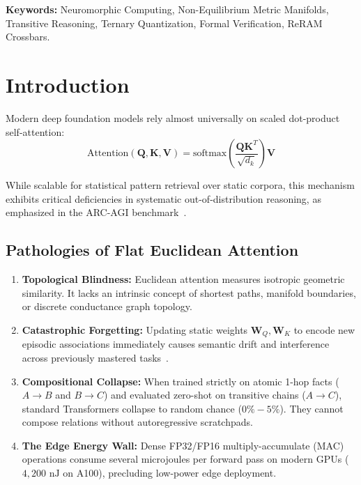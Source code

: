 \documentclass[11pt,a4paper]{article}
\begin{document}
\vspace{0.5em}
\textbf{Keywords:} Neuromorphic Computing, Non-Equilibrium Metric Manifolds, Transitive Reasoning, Ternary Quantization, Formal Verification, ReRAM Crossbars.


\section{Introduction}

Modern deep foundation models rely almost universally on scaled dot-product self-attention:
\begin{equation}
\text{Attention}(\mathbf{Q}, \mathbf{K}, \mathbf{V}) = \text{softmax}\left(\frac{\mathbf{Q}\mathbf{K}^T}{\sqrt{d_k}}\right)\mathbf{V}
\end{equation}

While scalable for statistical pattern retrieval over static corpora, this mechanism exhibits critical deficiencies in systematic out-of-distribution reasoning, as emphasized in the ARC-AGI benchmark~\cite{chollet2019measure}.

\subsection{Pathologies of Flat Euclidean Attention}
\begin{enumerate}[leftmargin=1.5em]
    \item \textbf{Topological Blindness:} Euclidean attention measures isotropic geometric similarity. It lacks an intrinsic concept of shortest paths, manifold boundaries, or discrete conductance graph topology.
    \item \textbf{Catastrophic Forgetting:} Updating static weights $\mathbf{W}_Q, \mathbf{W}_K$ to encode new episodic associations immediately causes semantic drift and interference across previously mastered tasks~\cite{mcclelland1995complementary}.
    \item \textbf{Compositional Collapse:} When trained strictly on atomic 1-hop facts ($A \to B$ and $B \to C$) and evaluated zero-shot on transitive chains ($A \to C$), standard Transformers collapse to random chance ($0\%-5\%$). They cannot compose relations without autoregressive scratchpads.
    \item \textbf{The Edge Energy Wall:} Dense FP32/FP16 multiply-accumulate (MAC) operations consume several microjoules per forward pass on modern GPUs ($4,200\text{ nJ}$ on A100), precluding low-power edge deployment.
\end{enumerate}
\end{document}
